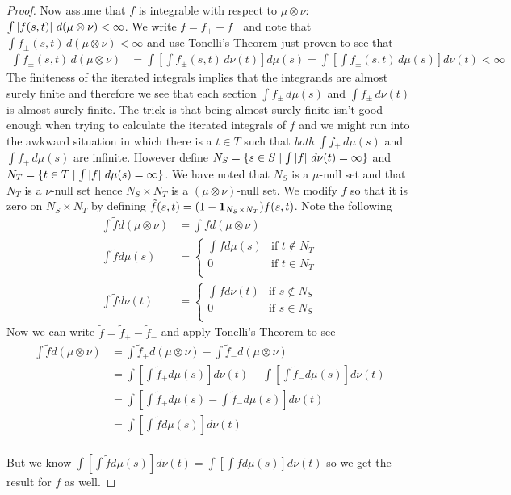 \begin{proof}
Now assume that $f$ is integrable with respect to $\mu \otimes \nu$: 
$\int \left \vert f(s,t) \right \vert \,  d (\mu \otimes \nu) < \infty$.  We
write $f = f_+ - f_-$ and note that $\int f_\pm(s,t) \,  d (\mu
\otimes \nu) < \infty$ and use Tonelli's Theorem just proven to see
that 
\begin{align*}
\int f_\pm(s,t) \,  d (\mu \otimes \nu) &= \int \left [ \int f_\pm(s,t) \, d
\nu(t) \right ] d \mu(s)  = \int \left [ \int f_\pm(s,t) \, d \mu(s)
\right ] d\nu(t) < \infty
\end{align*}
The finiteness of the iterated integrals implies that the integrands
are almost surely finite and therefore we see that each section 
$\int f_\pm \, d\mu(s)$ and $\int f_\pm \, d\nu(t)$ is almost surely
finite.  The trick is that being almost surely finite isn't good
enough when trying to calculate the iterated integrals of $f$ and we
might run into the awkward situation in which there is a $t \in T$
such that \emph{both} $\int f_+ \, d\mu(s)$ and $\int f_+ \, d\mu(s)$
are infinite.  However define
$N_S = \{ s \in S \mid \int \left \vert f \right \vert \, d\nu(t) = \infty \}$ and $N_T =
\{ t \in T \mid \int \left \vert f \right \vert \, d\mu(s) = \infty \}$.  We have noted
that $N_S$ is a $\mu$-null set and that $N_T$ is a $\nu$-null set
hence $N_S \times N_T$ is a $(\mu \otimes \nu)$-null set.  We modify
$f$ so that it is zero on $N_S \times N_T$ by defining 
$\tilde{f}(s,t) = (1 - \textbf{1}_{N_S \times N_T}) f(s,t)$.  Note
the following 
\begin{align*}
\int \tilde{f} d(\mu\otimes \nu) &= \int f d(\mu\otimes \nu) \\
\int \tilde{f} d\mu(s) &= \begin{cases}
\int f d\mu(s) & \text{if $t \notin N_T$} \\ 
0 & \text{if $t \in N_T$} \\ 
\end{cases} \\
\int \tilde{f} d\nu(t) &= \begin{cases}
\int f d\nu(t) & \text{if $s \notin N_S$} \\ 
0 & \text{if $s \in N_S$} \\ 
\end{cases}
\end{align*}
Now we can write $\tilde{f} = \tilde{f}_+ - \tilde{f}_-$ and apply
Tonelli's Theorem to see
\begin{align*}
\int \tilde{f} d(\mu\otimes \nu) &= \int \tilde{f}_+ d(\mu\otimes \nu)
- \int \tilde{f}_- d(\mu\otimes \nu) \\
&= \int \left [ \int \tilde{f}_+ d\mu(s)\right ] d \nu(t) - \int \left
  [ \int \tilde{f}_- d\mu(s)\right ] d \nu(t) \\
&= \int \left [  \int \tilde{f}_+ d\mu(s) - \int \tilde{f}_-
d\mu(s) \right ] d \nu(t) \\
&= \int \left [ \int \tilde{f} d\mu(s)\right ] d \nu(t) \\
\end{align*}

But we know $\int \left [ \int \tilde{f} d\mu(s)\right ] d \nu(t) =
\int \left [ \int f d\mu(s)\right ] d \nu(t)$ so we get the result for
$f$ as well.
\end{proof}

